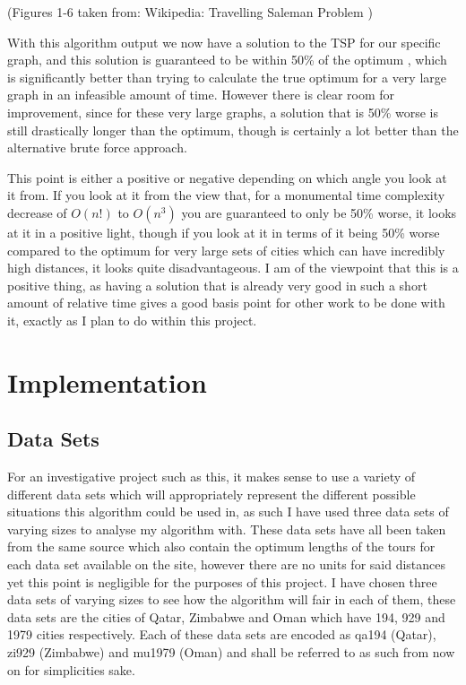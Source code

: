 \documentclass[11pt,a4paper,titlepage]{article}
\begin{document}
(Figures 1-6 taken from: Wikipedia: Travelling Saleman Problem \cite{TSPWiki})

With this algorithm output we now have a solution to the TSP for our specific graph, and this solution is guaranteed to be within 50\% of the optimum \cite{ChrAlg}, which is significantly better than trying to calculate the true optimum for a very large graph in an infeasible amount of time. However there is clear room for improvement, since for these very large graphs, a solution that is 50\% worse is still drastically longer than the optimum, though is certainly a lot better than the alternative brute force approach. 

This point is either a positive or negative depending on which angle you look at it from. If you look at it from the view that, for a monumental time complexity decrease of $O(n!)$ to $O(n^3)$ you are guaranteed to only be 50\% worse, it looks at it in a positive light, though if you look at it in terms of it being 50\% worse compared to the optimum for very large sets of cities which can have incredibly high distances, it looks quite disadvantageous. I am of the viewpoint that this is a positive thing, as having a solution that is already very good in such a short amount of relative time gives a good basis point for other work to be done with it, exactly as I plan to do within this project.

\section{Implementation}

\subsection{Data Sets}

For an investigative project such as this, it makes sense to use a variety of different data sets which will appropriately represent the different possible situations this algorithm could be used in, as such I have used three data sets of varying sizes to analyse my algorithm with. These data sets have all been taken from the same source \cite{TSPRep1} which also contain the optimum lengths of the tours for each data set available on the site, however there are no units for said distances yet this point is negligible for the purposes of this project. I have chosen three data sets of varying sizes to see how the algorithm will fair in each of them, these data sets are the cities of Qatar, Zimbabwe and Oman which have 194, 929 and 1979 cities respectively. Each of these data sets are encoded as qa194 (Qatar), zi929 (Zimbabwe) and mu1979 (Oman) and shall be referred to as such from now on for simplicities sake.
\pagebreak
\end{document}
